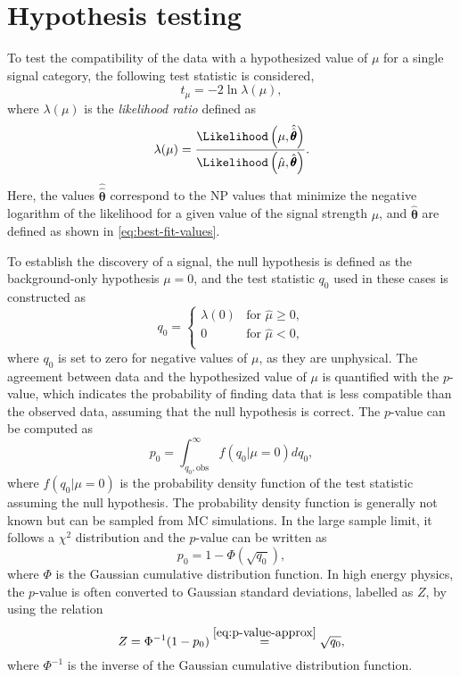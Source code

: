 \section{Hypothesis testing}
\label{sec:hypothesis-testing}
To test the compatibility of the data with a hypothesized value of $\mu$ for a single signal category, the following test statistic is considered,
\begin{equation}
    t_\mu = -2 \ln \lambda(\mu),
\end{equation}
where $\lambda(\mu)$ is the \emph{likelihood ratio} defined as
\begin{equation}
    \label{eq:likelihoodratio}
    \lambda(\mu) = \frac{ \Likelihood \left( \mu, \hat{\hat{\pmb{\theta}}} \right) } { \Likelihood \left( \hat{\mu} , \hat{\pmb{\theta}} \right) }.
\end{equation}
Here, the values $\hat{\hat{\pmb{\theta}}}$ correspond to the NP values that minimize the negative logarithm of the likelihood for a given value of the signal strength $\mu$, and $\hat{\pmb{\theta}}$ are defined as shown in \cref{eq:best-fit-values}. 

To establish the discovery of a signal, the null hypothesis is defined as the background-only hypothesis $\mu = 0$, and the test statistic $q_0$ used in these cases is constructed as 
\begin{equation}
    q_0 =
     \begin{cases}
       \lambda(0) & \text{for } \hat{\mu} \ge 0, \\
       0 & \text{for } \hat{\mu} < 0,  \\
     \end{cases}
     \label{eq:q0}
  \end{equation}
where $q_0$ is set to zero for negative values of $\mu$, as they are unphysical.
The agreement between data and the hypothesized value of $\mu$ is quantified with the $p$-value, which indicates the probability of finding data that is less compatible than the observed data, assuming that the null hypothesis is correct.
The $p$-value can be computed as
\begin{equation}
    \label{eq:p-value-discovery}
    p_0 = \int_{q_0, \text{obs}}^{\infty} f \left( q_0 | \mu = 0 \right) dq_0,
\end{equation}
where $f \left( q_0 | \mu = 0 \right)$ is the probability density function of the test statistic assuming the null hypothesis.
The probability density function is generally not known but can be sampled from MC simulations. 
In the large sample limit, it follows a $\chi^2$ distribution and the $p$-value can be written as
\begin{equation}
    \label{eq:p-value-approx}
    p_0 = 1 - \Phi( \sqrt{q_0}),
\end{equation}
where $\Phi$ is the Gaussian cumulative distribution function. 
In high energy physics, the $p$-value is often converted to Gaussian standard deviations, labelled as $Z$, by using the relation
\begin{equation}
    \label{eq:Z0}
    Z = \Phi^{-1} ( 1 - p_0) \overset{\ref{eq:p-value-approx}}{=} \sqrt{q_0},
\end{equation}
where $\Phi^{-1}$ is the inverse of the Gaussian cumulative distribution function. 


